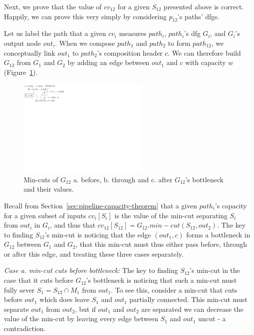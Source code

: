 Next, we prove that the value of $cv_{12}$ for a given $S_{12}$ presented above is correct. Happily, we can prove this very simply by considering $p_{12}$'s paths' dfgs.

Let us label the path that a given $cv_{i}$ measures $path_i$, $path_i$'s dfg $G_i$, and $G_i$'s output node $out_i$. When we compose $path_1$ and $path_2$ to form $path_{12}$, we conceptually link $out_1$ to $path_2$'s composition header $c$. We can therefore build $G_{12}$ from $G_1$ and $G_2$ by adding an edge between $out_1$ and $c$ with capacity $w$ (Figure~\ref{fig:min-cuts-in-composed-pipeline}).

\begin{figure}[tbh]
    \centering
    \vspace{-1mm}
    \includegraphics[clip, trim=0in 8.5in 9in 0in, width=2.5in]{figures/min-cuts-in-composed-pipeline.pdf}
    \vspace{-2mm}
    \caption{Min-cuts of $G_{12}$ a. before, b. through and c. after $G_{12}$'s bottleneck and their values.}
    \label{fig:min-cuts-in-composed-pipeline}
    \vspace{-2mm}
\end{figure}


Recall from Section~\ref{sec:pipeline-capacity-theorem} that a given $path_i$'s capacity for a given subset of inputs $cv_i[S_i]$ is the value of the min-cut separating $S_i$ from $out_i$ in $G_i$, and thus that $cv_{12}[S_{12}] = G_{12}.min-cut(S_{12}, out_2)$. The key to finding $S_{12}$'s min-cut is noticing that the edge $(out_1, c)$ forms a bottleneck in $G_{12}$ between $G_1$ and $G_2$, that this min-cut must thus either pass before, through or after this edge, and treating these three cases separately.

\vspace{3mm}
\textit{Case a. min-cut cuts before bottleneck:} The key to finding $S_{12}$'s min-cut in the case that it cuts before $G_{12}$'s bottleneck is noticing that such a min-cut must fully sever $S_1 = S_{12} \cap M_1$ from $out_1$. To see this, consider a min-cut that cuts before $out_1$ which does leave $S_1$ and $out_1$ partially connected. This min-cut must separate $out_1$ from $out_2$, but if $out_1$ and $out_2$ are separated we can decrease the value of the min-cut by leaving every edge between $S_1$ and $out_1$ uncut - a contradiction.


